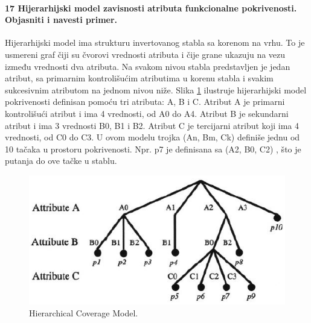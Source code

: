 \documentclass[a4paper, 12pt]{article}
\begin{document}
\paragraph{17 Hijerarhijski model zavisnosti atributa funkcionalne pokrivenosti. Objasniti i navesti primer.}
\hfill \break
\indent Hijerarhijski model ima strukturu invertovanog stabla sa korenom na vrhu. To je usmereni graf čiji su čvorovi vrednosti atributa i čije grane ukazuju na vezu između vrednosti dva atributa. Na svakom nivou stabla predstavljen je jedan atribut, sa primarnim kontrolišućim atributima u korenu stabla i svakim sukcesivnim atributom na jednom nivou niže. Slika \ref{img-hierarchical-coverage-model} ilustruje hijerarhijski model pokrivenosti definisan pomoću tri atributa: A, B i C. Atribut A je primarni kontrolišući atribut i ima 4 vrednosti, od A0 do A4. Atribut B je sekundarni atribut i ima 3 vrednosti B0, B1 i B2. Atribut C je tercijarni atribut koji ima 4 vrednosti, od C0 do C3. U ovom modelu trojka (An, Bm, Ck) definiše jednu od 10 tačaka u prostoru pokrivenosti. Npr. p7 je definisana sa (A2, B0, C2) , što je putanja do ove tačke u stablu.
\begin{figure}[h!]
\centering
\includegraphics[scale=0.5]{img-hierarchical-coverage-model.png}
\caption{Hierarchical Coverage Model.}
\label{img-hierarchical-coverage-model}
\end{figure}
\end{document}
